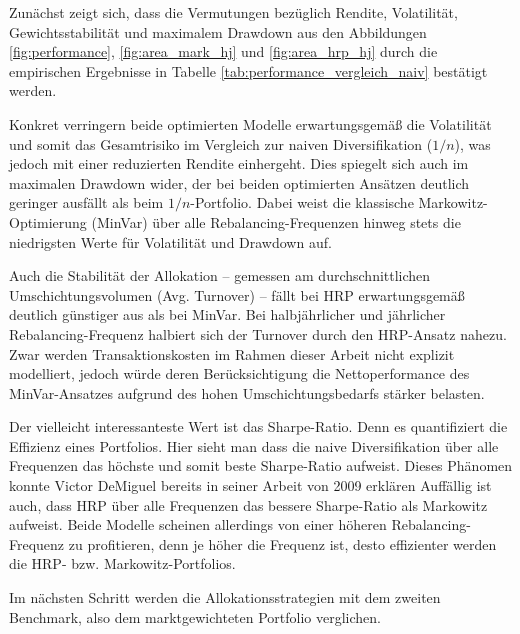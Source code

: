 \documentclass[parskip=half]{scrartcl}
\begin{document}
	Zunächst zeigt sich, dass die Vermutungen bezüglich Rendite, Volatilität, Gewichtsstabilität und maximalem Drawdown aus den Abbildungen \ref{fig:performance}, \ref{fig:area_mark_hj} und \ref{fig:area_hrp_hj} durch die empirischen Ergebnisse in Tabelle \ref{tab:performance_vergleich_naiv} bestätigt werden.
	
	Konkret verringern beide optimierten Modelle erwartungsgemäß die Volatilität und somit das Gesamtrisiko im Vergleich zur naiven Diversifikation ($1/n$), was jedoch mit einer reduzierten Rendite einhergeht. Dies spiegelt sich auch im maximalen Drawdown wider, der bei beiden optimierten Ansätzen deutlich geringer ausfällt als beim $1/n$-Portfolio. Dabei weist die klassische Markowitz-Optimierung (MinVar) über alle Rebalancing-Frequenzen hinweg stets die niedrigsten Werte für Volatilität und Drawdown auf. 
	
	Auch die Stabilität der Allokation – gemessen am durchschnittlichen Umschichtungsvolumen (Avg. Turnover) – fällt bei HRP erwartungsgemäß deutlich günstiger aus als bei MinVar. Bei halbjährlicher und jährlicher Rebalancing-Frequenz halbiert sich der Turnover durch den HRP-Ansatz nahezu. Zwar werden Transaktionskosten im Rahmen dieser Arbeit nicht explizit modelliert, jedoch würde deren Berücksichtigung die Nettoperformance des MinVar-Ansatzes aufgrund des hohen Umschichtungsbedarfs stärker belasten.
	
	
	Der vielleicht interessanteste Wert ist das Sharpe-Ratio. Denn es quantifiziert die Effizienz eines Portfolios. Hier sieht man dass die naive Diversifikation über alle Frequenzen das höchste und somit beste Sharpe-Ratio aufweist. Dieses Phänomen konnte Victor DeMiguel bereits in seiner Arbeit von 2009 erklären \parencite[1947]{Puzzle} Auffällig ist auch, dass HRP über alle Frequenzen das bessere Sharpe-Ratio als Markowitz aufweist. Beide Modelle scheinen allerdings von einer höheren Rebalancing-Frequenz zu profitieren, denn je höher die Frequenz ist, desto effizienter werden die HRP- bzw. Markowitz-Portfolios.
	
	
	\clearpage
	
	Im nächsten Schritt werden die Allokationsstrategien mit dem zweiten Benchmark, also dem marktgewichteten Portfolio verglichen.
	
\end{document}
